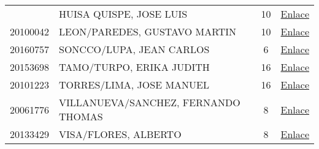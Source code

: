 \begin{table}[hbt!]
\begin{tabular}{clcc}
		& HUISA QUISPE, JOSE LUIS                          & 10           & \href{https://drive.google.com/open?id=1H7Mn9tqpeo8jPnXsGEfFqS-yYBD0bWml94uqkU9Wk-Y}{Enlace}                                    \\
		20100042     & LEON/PAREDES, GUSTAVO MARTIN                     & 10           & \href{https://drive.google.com/open?id=1H7Mn9tqpeo8jPnXsGEfFqS-yYBD0bWml94uqkU9Wk-Y}{Enlace}                                    \\
		20160757     & SONCCO/LUPA, JEAN CARLOS                         & 6            & \href{https://drive.google.com/open?id=1H7Mn9tqpeo8jPnXsGEfFqS-yYBD0bWml94uqkU9Wk-Y}{Enlace}                                    \\
		20153698     & TAMO/TURPO, ERIKA JUDITH                         & 16           & \href{https://drive.google.com/open?id=1H7Mn9tqpeo8jPnXsGEfFqS-yYBD0bWml94uqkU9Wk-Y}{Enlace}                                    \\
		20101223     & TORRES/LIMA, JOSE MANUEL                         & 16           & \href{https://drive.google.com/open?id=1H7Mn9tqpeo8jPnXsGEfFqS-yYBD0bWml94uqkU9Wk-Y}{Enlace}                                    \\
		20061776     & VILLANUEVA/SANCHEZ, FERNANDO THOMAS              & 8            & \href{https://drive.google.com/open?id=1H7Mn9tqpeo8jPnXsGEfFqS-yYBD0bWml94uqkU9Wk-Y}{Enlace}                                    \\
		20133429     & VISA/FLORES, ALBERTO                             & 8            & \href{https://drive.google.com/open?id=1H7Mn9tqpeo8jPnXsGEfFqS-yYBD0bWml94uqkU9Wk-Y}{Enlace}                                   
	\end{tabular}
\end{table}

